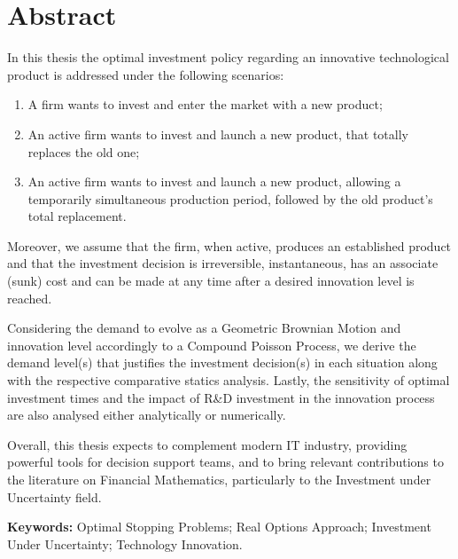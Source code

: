 
\section*{Abstract}


In this thesis the optimal investment policy regarding an innovative technological product is addressed under the following scenarios:
\begin{enumerate}
	\item A firm wants to invest and enter the market with a new product;
	\item An active firm wants to invest and launch a new product, that totally replaces the old one; 
	\item An active firm wants to invest and launch a new product, allowing a temporarily simultaneous production period, followed by the old product's total replacement.
\end{enumerate}

Moreover, we assume that the firm, when active, produces an established product and that the investment decision is irreversible, instantaneous, has an associate (sunk) cost and can be made at any time after a desired innovation level is reached.

Considering the demand to evolve as a Geometric Brownian Motion and innovation level accordingly to a Compound Poisson Process, we derive the demand level(s) that justifies the investment decision(s) in each situation along with the respective comparative statics analysis. Lastly, the sensitivity of optimal investment times and the impact of R\&D investment in the innovation process are also analysed either analytically or numerically. 

Overall, this thesis expects to complement modern IT industry, providing powerful tools for decision support teams, and to bring relevant contributions to the literature on Financial Mathematics, particularly to the Investment under Uncertainty field.





\vfill

\textbf{\Large Keywords:} Optimal Stopping Problems; Real Options Approach; Investment Under Uncertainty; Technology Innovation.

